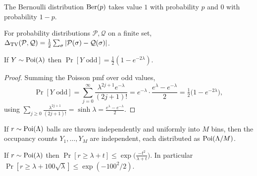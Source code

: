 \begin{lemma}
  \label{lem:bernoulli}
  \mathlibok
  The Bernoulli distribution $\operatorname{Ber}(p)$ takes value $1$ with probability $p$ and
  $0$ with probability $1-p$.
\end{lemma}

\begin{lemma}
  \label{lem:tv-distance}
  \mathlibok
  For probability distributions $\mathcal{P},\mathcal{Q}$ on a finite set,
  $\Delta_{\mathrm{TV}}(\mathcal{P},\mathcal{Q}) = \frac12\sum_\sigma
  |\mathcal{P}(\sigma) - \mathcal{Q}(\sigma)|$.
\end{lemma}

\begin{lemma}
  \label{lem:poisson-parity}
  If $Y \sim \operatorname{Poi}(\lambda)$ then $\Pr[Y \text{ odd}] = \tfrac12(1 - e^{-2\lambda})$.
\end{lemma}
\begin{proof}
  Summing the Poisson pmf over odd values,
  \[
    \Pr[Y \text{ odd}] = \sum_{j=0}^\infty \frac{\lambda^{2j+1}e^{-\lambda}}{(2j+1)!}
      = e^{-\lambda}\cdot\frac{e^{\lambda} - e^{-\lambda}}{2}
      = \tfrac12\big(1 - e^{-2\lambda}\big),
  \]
  using $\sum_{j\geq 0}\frac{\lambda^{2j+1}}{(2j+1)!} = \sinh\lambda =
  \frac{e^\lambda - e^{-\lambda}}{2}$.
\end{proof}

\begin{lemma}
  \label{lem:poisson-splitting}
  \notready
  If $r \sim \operatorname{Poi}(\Lambda)$ balls are thrown independently and uniformly into $M$
  bins, then the occupancy counts $Y_1,\dots,Y_M$ are independent, each
  distributed as $\operatorname{Poi}(\Lambda/M)$.
\end{lemma}

\begin{lemma}
  \label{lem:poisson-chernoff}
  \notready
  If $r \sim \operatorname{Poi}(\lambda)$ then $\Pr[r \geq \lambda + t] \leq
  \exp\!\big(\frac{-t^2}{\lambda + t}\big)$. In particular
  $\Pr[r \geq \lambda + 100\sqrt{\lambda}] \leq \exp(-100^2/2)$.
\end{lemma}

